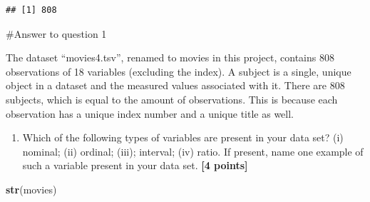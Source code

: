 \documentclass[
]{article}
\newenvironment{Shaded}{\begin{snugshade}}{\end{snugshade}}
\newcommand{\FunctionTok}[1]{\textcolor[rgb]{0.13,0.29,0.53}{\textbf{#1}}}
\newcommand{\NormalTok}[1]{#1}
\newcommand{\SpecialCharTok}[1]{\textcolor[rgb]{0.81,0.36,0.00}{\textbf{#1}}}
\providecommand{\tightlist}{%
  \setlength{\itemsep}{0pt}\setlength{\parskip}{0pt}}
\begin{document}
\begin{Shaded}
\end{Shaded}

\begin{verbatim}
## [1] 808
\end{verbatim}

\#Answer to question 1

The dataset ``movies4.tsv'', renamed to movies in this project, contains
808 observations of 18 variables (excluding the index). A subject is a
single, unique object in a dataset and the measured values associated
with it. There are 808 subjects, which is equal to the amount of
observations. This is because each observation has a unique index number
and a unique title as well.

\begin{enumerate}
\def\labelenumi{\arabic{enumi}.}
\setcounter{enumi}{1}
\tightlist
\item
  Which of the following types of variables are present in your data
  set? (i) nominal; (ii) ordinal; (iii); interval; (iv) ratio. If
  present, name one example of such a variable present in your data set.
  \textbf{[4 points]}
\end{enumerate}

\begin{Shaded}
\begin{Highlighting}[]
\FunctionTok{str}\NormalTok{(movies)}
\end{Highlighting}
\end{Shaded}
\end{document}
